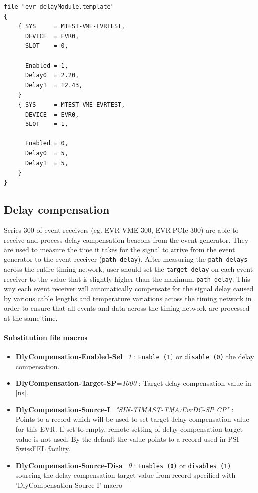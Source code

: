 \documentclass[12pt,a4paper]{article}
\begin{document}
\begin{verbatim}
file "evr-delayModule.template"
{
    { SYS     = MTEST-VME-EVRTEST,
      DEVICE  = EVR0,
      SLOT    = 0,

      Enabled = 1,
      Delay0  = 2.20,
      Delay1  = 12.43,
    }
    { SYS     = MTEST-VME-EVRTEST,
      DEVICE  = EVR0,
      SLOT    = 1,

      Enabled = 0,
      Delay0  = 5,
      Delay1  = 5,
    }
}
\end{verbatim}

\subsection{Delay compensation}\label{sec:Delay compensation}
Series 300 of event receivers (eg. EVR-VME-300, EVR-PCIe-300) are able to receive and process delay compensation beacons from the event generator. They are used to measure the time it takes for the signal to arrive from the event generator to the event receiver (\texttt{path delay}). After measuring the \texttt{path delays} across the entire timing network, user should set the \texttt{target delay} on each event receiver to the value that is slightly higher than the maximum \texttt{path delay}. This way each event receiver will automatically compensate for the signal delay caused by various cable lengths and temperature variations across the timing network in order to ensure that all events and data across the timing network are processed at the same time.

\paragraph{Substitution file macros}
\begin{itemize}
\item
  \textbf{DlyCompensation-Enabled-Sel}=\emph{1} : \texttt{Enable (1)} or \texttt{disable (0)} the delay compensation.
\item 
  \textbf{DlyCompensation-Target-SP}=\emph{1000} : Target delay compensation value in [ns].
\item 
  \textbf{DlyCompensation-Source-I}=\emph{"SIN-TIMAST-TMA:EvrDC-SP CP"} :  Points to a record which will be used to set target delay compensation value for this EVR. If set to empty, remote setting of delay compensation target value is not used. By the default the value points to a record used in PSI SwissFEL facility.
\item 
  \textbf{DlyCompensation-Source-Disa}=\emph{0} : \texttt{Enables (0)} or \texttt{disables (1)} sourcing the delay compensation target value from record specified with 'DlyCompensation-Source-I' macro
\end{itemize}
\end{document}
